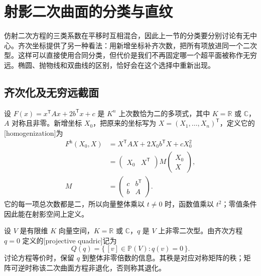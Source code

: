 
% 
% 

\section{射影二次曲面的分类与直纹}
\label{g1:sec:0203}

仿射二次方程的三类系数在平移时互相混合，因此上一节的分类要分别讨论有无中心。齐次坐标提供了另一种看法：用新增坐标补齐次数，把所有项放进同一个二次型。这样可以直接使用合同分类，但代价是我们不再固定哪一个超平面被称作无穷远。椭圆、抛物线和双曲线的区别，恰好会在这个选择中重新出现。

\subsection{齐次化及无穷远截面}
\label{g1:subsec:0203:01}

设 \(F(x)=x^{\mathsf T}Ax+2b^{\mathsf T}x+c\) 是 \(K^n\) 上次数恰为二的多项式，其中 \(K=\mathbb R\) 或 \(\mathbb C\)，\(A\) 对称且非零。新增坐标 \(X_0\)，把原来的坐标写为 \(X=(X_1,\ldots,X_n)^{\mathsf T}\)，定义它的[homogenization]为
\begin{equation}
	\label{g1:eq:quadric-homogenization}
	\begin{aligned}
		F^{\mathrm h}(X_0,X)
		&=X^{\mathsf T}AX+2X_0b^{\mathsf T}X+cX_0^2\\
		&=\begin{pmatrix}X_0&X^{\mathsf T}\end{pmatrix}
		M\begin{pmatrix}X_0\\X\end{pmatrix},\\
		M&=\begin{pmatrix}c&b^{\mathsf T}\\b&A\end{pmatrix}.
	\end{aligned}
\end{equation}
它的每一项总次数都是二，所以向量整体乘以 \(t\ne0\) 时，函数值乘以 \(t^2\)；零值条件因此能在射影空间上定义。

\begin{definition}[射影二次曲面]
	\label{g1:def:projective-quadric}
	设 \(V\) 是有限维 \(K\) 向量空间，\(K=\mathbb R\) 或 \(\mathbb C\)，\(q\) 是 \(V\) 上非零二次型。由齐次方程 \(q=0\) 定义的[projective quadric]记为
	\[
		Q(q)=\{\,[v]\in\mathbb P(V):q(v)=0\,\}.
	\]
	讨论方程等价时，保留 \(q\) 到整体非零倍数的信息。其秩是对应对称矩阵的秩；矩阵可逆时称该二次曲面方程非退化，否则称其退化。
\end{definition}

